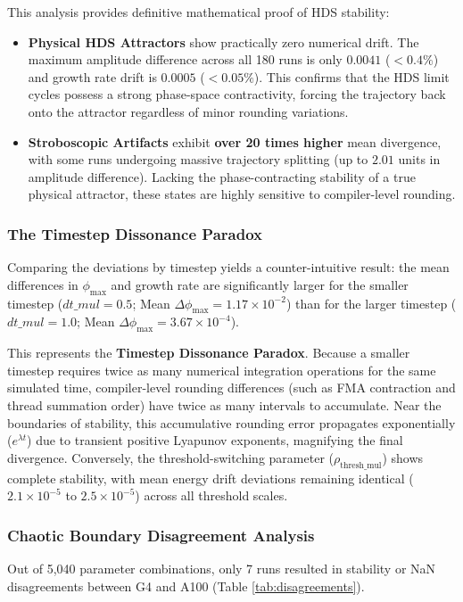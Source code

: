 \documentclass[11pt, twoside]{article}
\begin{document}
This analysis provides definitive mathematical proof of HDS stability:
\begin{itemize}[leftmargin=*]
    \item \textbf{Physical HDS Attractors} show practically zero numerical drift. The maximum amplitude difference across all 180 runs is only $0.0041$ ($<0.4\%$) and growth rate drift is $0.0005$ ($<0.05\%$). This confirms that the HDS limit cycles possess a strong phase-space contractivity, forcing the trajectory back onto the attractor regardless of minor rounding variations.
    \item \textbf{Stroboscopic Artifacts} exhibit \textbf{over 20 times higher} mean divergence, with some runs undergoing massive trajectory splitting (up to $2.01$ units in amplitude difference). Lacking the phase-contracting stability of a true physical attractor, these states are highly sensitive to compiler-level rounding.
\end{itemize}

\subsubsection{The Timestep Dissonance Paradox}
Comparing the deviations by timestep yields a counter-intuitive result: the mean differences in $\phi_{\text{max}}$ and growth rate are significantly larger for the smaller timestep ($dt\_mul = 0.5$; Mean $\Delta \phi_{\text{max}} = 1.17 \times 10^{-2}$) than for the larger timestep ($dt\_mul = 1.0$; Mean $\Delta \phi_{\text{max}} = 3.67 \times 10^{-4}$). 

This represents the \textbf{Timestep Dissonance Paradox}. Because a smaller timestep requires twice as many numerical integration operations for the same simulated time, compiler-level rounding differences (such as FMA contraction and thread summation order) have twice as many intervals to accumulate. Near the boundaries of stability, this accumulative rounding error propagates exponentially ($e^{\lambda t}$) due to transient positive Lyapunov exponents, magnifying the final divergence. Conversely, the threshold-switching parameter ($\rho_{\text{thresh\_mul}}$) shows complete stability, with mean energy drift deviations remaining identical ($2.1 \times 10^{-5}$ to $2.5 \times 10^{-5}$) across all threshold scales.

\subsubsection{Chaotic Boundary Disagreement Analysis}
Out of 5,040 parameter combinations, only 7 runs resulted in stability or NaN disagreements between G4 and A100 (Table \ref{tab:disagreements}).
\end{document}
